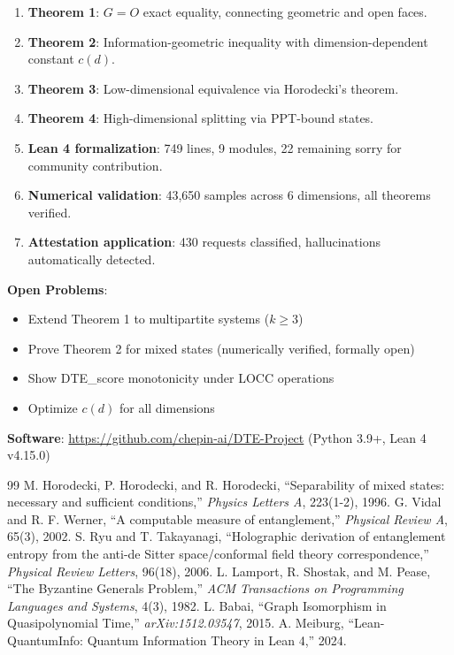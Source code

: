 \documentclass[11pt,a4paper]{article}
\theoremstyle{definition}
\begin{document}
\begin{enumerate}
    \item \textbf{Theorem 1}: $G = O$ exact equality, connecting geometric and open faces.
    \item \textbf{Theorem 2}: Information-geometric inequality with dimension-dependent constant $c(d)$.
    \item \textbf{Theorem 3}: Low-dimensional equivalence via Horodecki's theorem.
    \item \textbf{Theorem 4}: High-dimensional splitting via PPT-bound states.
    \item \textbf{Lean 4 formalization}: 749 lines, 9 modules, 22 remaining sorry for community contribution.
    \item \textbf{Numerical validation}: 43,650 samples across 6 dimensions, all theorems verified.
    \item \textbf{Attestation application}: 430 requests classified, hallucinations automatically detected.
\end{enumerate}

\textbf{Open Problems}:
\begin{itemize}
    \item Extend Theorem 1 to multipartite systems ($k \geq 3$)
    \item Prove Theorem 2 for mixed states (numerically verified, formally open)
    \item Show DTE\_score monotonicity under LOCC operations
    \item Optimize $c(d)$ for all dimensions
\end{itemize}

\textbf{Software}: \url{https://github.com/chepin-ai/DTE-Project} (Python 3.9+, Lean 4 v4.15.0)

\begin{thebibliography}{99}
 M. Horodecki, P. Horodecki, and R. Horodecki, ``Separability of mixed states: necessary and sufficient conditions,'' \textit{Physics Letters A}, 223(1-2), 1996.
 G. Vidal and R. F. Werner, ``A computable measure of entanglement,'' \textit{Physical Review A}, 65(3), 2002.
 S. Ryu and T. Takayanagi, ``Holographic derivation of entanglement entropy from the anti-de Sitter space/conformal field theory correspondence,'' \textit{Physical Review Letters}, 96(18), 2006.
 L. Lamport, R. Shostak, and M. Pease, ``The Byzantine Generals Problem,'' \textit{ACM Transactions on Programming Languages and Systems}, 4(3), 1982.
 L. Babai, ``Graph Isomorphism in Quasipolynomial Time,'' \textit{arXiv:1512.03547}, 2015.
 A. Meiburg, ``Lean-QuantumInfo: Quantum Information Theory in Lean 4,'' 2024.
\end{thebibliography}
\end{document}
